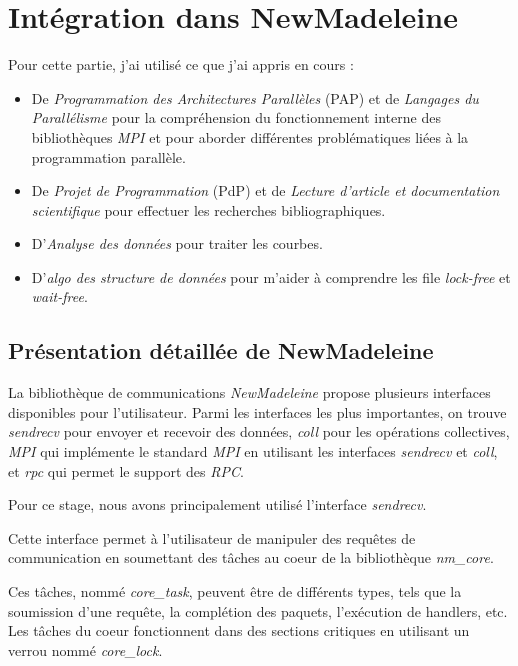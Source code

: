 \section{Intégration dans NewMadeleine}

Pour cette partie, j'ai utilisé ce que j'ai appris en cours :

\begin{itemize}
  \item De \emph{Programmation des Architectures Parallèles} (PAP) et de \emph{Langages du Parallélisme} pour la compréhension du fonctionnement interne des bibliothèques \emph{MPI} et pour aborder différentes problématiques liées à la programmation parallèle.
  \item De \emph{Projet de Programmation} (PdP) et de \emph{Lecture d'article et documentation scientifique} pour effectuer les recherches bibliographiques.
  \item D'\emph{Analyse des données} pour traiter les courbes.
  \item D'\emph{algo des structure de données} pour m'aider à comprendre les file \emph{lock-free} et \emph{wait-free}.
\end{itemize}

\subsection{Présentation détaillée de NewMadeleine}

La bibliothèque de communications \emph{NewMadeleine} propose plusieurs interfaces disponibles pour l'utilisateur.
Parmi les interfaces les plus importantes, on trouve \emph{sendrecv} pour envoyer et recevoir des données,
\emph{coll} pour les opérations collectives,
\emph{MPI} qui implémente le standard \emph{MPI} en utilisant les interfaces \emph{sendrecv} et \emph{coll},
et \emph{rpc} qui permet le support des \emph{RPC}.


Pour ce stage, nous avons principalement utilisé l'interface \emph{sendrecv}.

Cette interface permet à l'utilisateur de manipuler des requêtes de communication
en soumettant des tâches au coeur de la bibliothèque \emph{nm_core}.

Ces tâches, nommé \emph{core_task}, peuvent être de différents types, tels que la soumission d'une requête,
la complétion des paquets, l'exécution de handlers, etc.
Les tâches du coeur fonctionnent dans des sections critiques en utilisant un verrou nommé \emph{core_lock}.

